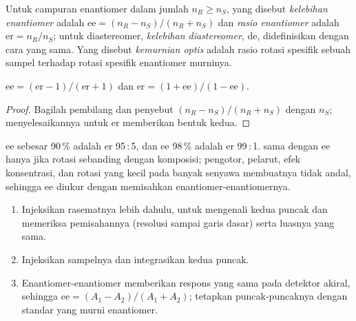 \begin{definition}\label{def:b3:asymmetric-synthesis:ee}
Untuk campuran enantiomer dalam jumlah $n_R \ge n_S$, yang disebut \emph{kelebihan
enantiomer} adalah $\mathrm{ee} = (n_R - n_S)/(n_R + n_S)$ dan \emph{rasio enantiomer}
 adalah $\mathrm{er} = n_R/n_S$; untuk diastereomer, \emph{kelebihan
diastereomer}, de, didefinisikan dengan cara yang
sama. Yang disebut \emph{kemurnian optis} adalah rasio
rotasi spesifik sebuah sampel terhadap rotasi spesifik enantiomer murninya.
\end{definition}

\begin{proposition}[ee dan er]\label{prop:b3:asymmetric-synthesis:ee-er}
$\mathrm{ee} = (\mathrm{er} - 1)/(\mathrm{er} + 1)$ dan $\mathrm{er} = (1 + \mathrm{ee})/(1 - \mathrm{ee})$.
\end{proposition}

\begin{proof}
Bagilah pembilang dan penyebut $(n_R - n_S)/(n_R + n_S)$ dengan $n_S$; menyelesaikannya untuk er memberikan
bentuk kedua.
\end{proof}

ee sebesar 90\,\% adalah er 95\,:\,5, dan ee 98\,\% adalah er 99\,:\,1. 
sama dengan ee hanya jika rotasi sebanding dengan komposisi; pengotor,
pelarut, efek konsentrasi, dan rotasi yang kecil pada banyak senyawa membuatnya
tidak andal, sehingga ee diukur dengan memisahkan enantiomer-enantiomernya.

\begin{method}\label{met:b3:asymmetric-synthesis:ee-chromatogram}
\begin{enumerate}
  \item Injeksikan rasematnya lebih dahulu, untuk mengenali kedua puncak dan memeriksa
        pemisahannya (resolusi sampai garis dasar) serta luasnya yang sama.
  \item Injeksikan sampelnya dan integrasikan kedua puncak.
  \item Enantiomer-enantiomer memberikan respons yang sama pada detektor akiral, sehingga
        $\mathrm{ee} = (A_1 - A_2)/(A_1 + A_2)$; tetapkan puncak-puncaknya dengan standar yang murni enantiomer.
\end{enumerate}
\end{method}

